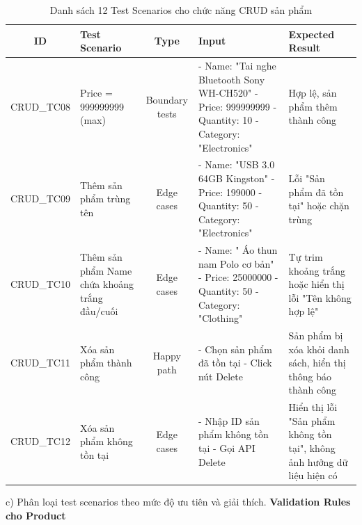\documentclass[a4paper,12pt]{article}
\begin{document}
\begin{table}[H]
\centering
\begin{tabularx}{\textwidth}{|c|>{\raggedright\arraybackslash}X|c|>{\raggedright\arraybackslash}X|>{\raggedright\arraybackslash}X|}
\hline
\textbf{ID} & \textbf{Test Scenario} & \textbf{Type} & \textbf{Input} & \textbf{Expected Result} \\ \hline

CRUD\_TC08 & Price = 999999999 (max) & Boundary tests &
- Name: "Tai nghe Bluetooth Sony WH-CH520" \newline
- Price: 999999999 \newline
- Quantity: 10 \newline
- Category: "Electronics" & Hợp lệ, sản phẩm thêm thành công \\ \hline

CRUD\_TC09 & Thêm sản phẩm trùng tên & Edge cases &
- Name: "USB 3.0 64GB Kingston" \newline
- Price: 199000 \newline
- Quantity: 50 \newline
- Category: "Electronics" & Lỗi "Sản phẩm đã tồn tại" hoặc chặn trùng \\ \hline

CRUD\_TC10 & Thêm sản phẩm Name chứa khoảng trắng đầu/cuối & Edge cases &
- Name: " Áo thun nam Polo cơ bản" \newline
- Price: 25000000 \newline
- Quantity: 50 \newline
- Category: "Clothing" & Tự trim khoảng trắng hoặc hiển thị lỗi "Tên không hợp lệ" \\ \hline

CRUD\_TC11 & Xóa sản phẩm thành công & Happy path &
- Chọn sản phẩm đã tồn tại \newline
- Click nút Delete & Sản phẩm bị xóa khỏi danh sách, hiển thị thông báo thành công \\ \hline

CRUD\_TC12 & Xóa sản phẩm không tồn tại & Edge cases &
- Nhập ID sản phẩm không tồn tại \newline
- Gọi API Delete & Hiển thị lỗi "Sản phẩm không tồn tại", không ảnh hưởng dữ liệu hiện có \\ \hline

\end{tabularx}
\caption{Danh sách 12 Test Scenarios cho chức năng CRUD sản phẩm}
\end{table}
c) Phân loại test scenarios theo mức độ ưu tiên và giải thích.
\textbf{Validation Rules cho Product}
\end{document}
